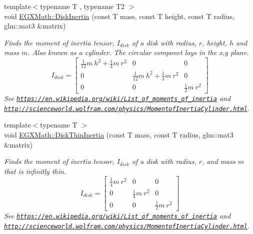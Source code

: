 \begin{DoxyCompactItemize}
{\footnotesize template$<$typename T , typename T2 $>$ }\\void \mbox{\hyperlink{group___e_g_x_math-_geometry-3_d-_disk_ga72f4af6da7f192c5edb789ee2ec955f3}{E\+G\+X\+Math\+::\+Disk\+Inertia}} (const T mass, const T height, const T radius, glm\+::mat3 \&matrix)
\begin{DoxyCompactList}\small\item\em Finds the moment of inertia tensor, $I_{disk}$ of a disk with radius, $r$, height, $h$ and mass $m$. Also known as a cylinder. The circular componet lays in the x,y plane. \[ I_{disk}=\begin{bmatrix} \frac{1}{12}m\ h^2 + \frac{1}{4}m\ r^2 & 0 & 0\\ 0 & \frac{1}{12}m\ h^2 + \frac{1}{4}m\ r^2 & 0\\ 0 & 0 & \frac{1}{2}m\ r^2 \end{bmatrix} \] See \href{https://en.wikipedia.org/wiki/List_of_moments_of_inertia}{\tt https\+://en.\+wikipedia.\+org/wiki/\+List\+\_\+of\+\_\+moments\+\_\+of\+\_\+inertia} and \href{http://scienceworld.wolfram.com/physics/MomentofInertiaCylinder.html}{\tt http\+://scienceworld.\+wolfram.\+com/physics/\+Momentof\+Inertia\+Cylinder.\+html}. \end{DoxyCompactList}\item 
{\footnotesize template$<$typename T $>$ }\\void \mbox{\hyperlink{group___e_g_x_math-_geometry-3_d-_disk_gace6b474777a879fb16de3e480f6776ee}{E\+G\+X\+Math\+::\+Disk\+Thin\+Inertia}} (const T mass, const T radius, glm\+::mat3 \&matrix)
\begin{DoxyCompactList}\small\item\em Finds the moment of inertia tensor, $I_{disk}$ of a disk with radius, $r$, and mass $m$ that is infinitly thin. \[ I_{disk}=\begin{bmatrix} \frac{1}{4}m\ r^2 & 0 & 0\\ 0 & \frac{1}{4}m\ r^2 & 0\\ 0 & 0 & \frac{1}{2}m\ r^2 \end{bmatrix} \] See \href{https://en.wikipedia.org/wiki/List_of_moments_of_inertia}{\tt https\+://en.\+wikipedia.\+org/wiki/\+List\+\_\+of\+\_\+moments\+\_\+of\+\_\+inertia} and \href{http://scienceworld.wolfram.com/physics/MomentofInertiaCylinder.html}{\tt http\+://scienceworld.\+wolfram.\+com/physics/\+Momentof\+Inertia\+Cylinder.\+html}. \end{DoxyCompactList}\end{DoxyCompactItemize}


